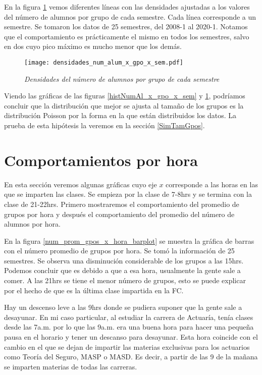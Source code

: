 En la figura \ref{densidadesNumAl_x_gpo_x_sem} vemos diferentes líneas con las densidades ajustadas a los valores del número de alumnos por grupo de cada semestre. Cada línea corresponde a un semestre. Se tomaron los datos de 25 semestres, del 2008-1 al 2020-1. Notamos que el comportamiento es prácticamente el mismo en todos los semestres, salvo en dos cuyo pico máximo es mucho menor que los demás. 

\begin{figure}[H]
\centering
\texttt{[image: densidades\_num\_alum\_x\_gpo\_x\_sem.pdf]} %
\caption{\textit{Densidades del número de alumnos por grupo de cada semestre}}\label{densidadesNumAl_x_gpo_x_sem}
\end{figure}

Viendo las gráficas de las figuras \ref{histNumAl_x_gpo_x_sem} y \ref{densidadesNumAl_x_gpo_x_sem}, podríamos concluir que la distribución que mejor se ajusta al tamaño de los grupos es la distribución Poisson por la forma en la que están distribuidos los datos. La prueba de esta hipótesis la veremos en la sección \ref{SimTamGpos}.



\section{Comportamientos por hora}

En esta sección veremos algunas gráficas cuyo eje $x$ corresponde a las horas en las que se imparten las clases. Se empieza por la clase de 7-8hrs y se termina con la clase de 21-22hrs. Primero mostraremos el comportamiento del promedio de grupos por hora y después el comportamiento del promedio del número de alumnos por hora.

En la figura \ref{num_prom_gpos_x_hora_barplot} se muestra la gráfica de barras con el número promedio de grupos por hora. Se tomó la información de 25 semestres. Se observa una disminución considerable de los grupos a las 15hrs. Podemos concluir que es debido a que a esa hora, usualmente la gente sale a comer. A las 21hrs se tiene el menor número de grupos, esto se puede explicar por el hecho de que es la última clase impartida en la FC.

Hay un descenso leve a las 9hrs donde se pudiera suponer que la gente sale a desayunar. En mi caso particular, al estudiar la carrera de Actuaría, tenía clases desde las 7a.m. por lo que las 9a.m. era una buena hora para hacer una pequeña pausa en el horario y tener un descanso para desayunar. Esta hora coincide con el cambio en el que se dejan de impartir las materias exclusivas para los actuarios como Teoría del Seguro, MASP o MASD. Es decir, a partir de las 9 de la mañana se imparten materias de todas las carreras.

